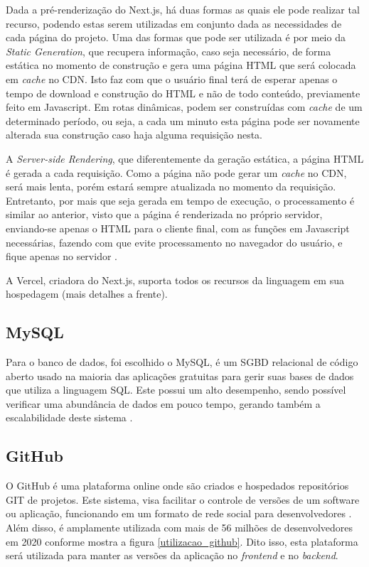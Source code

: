 Dada a pré-renderização do Next.js, há duas formas as quais ele pode realizar tal recurso, podendo estas serem utilizadas em conjunto dada as necessidades de cada página do projeto. Uma das formas que pode ser utilizada é por meio da \textit{Static Generation}, que recupera informação, caso seja necessário, de forma estática no momento de construção e gera uma página HTML que será colocada em \textit{cache} no CDN. Isto faz com que o usuário final terá de esperar apenas o tempo de download e construção do HTML e não de todo conteúdo, previamente feito em Javascript. Em rotas dinâmicas, podem ser construídas com \textit{cache} de um determinado período, ou seja, a cada um minuto esta página pode ser novamente alterada sua construção caso haja alguma requisição nesta.

A \textit{Server-side Rendering}, que diferentemente da geração estática, a página HTML é gerada a cada requisição. Como a página não pode gerar um \textit{cache} no CDN, será mais lenta, porém estará sempre atualizada no momento da requisição. Entretanto, por mais que seja gerada em tempo de execução, o processamento é similar ao anterior, visto que a página é renderizada no próprio servidor, enviando-se apenas o HTML para o cliente final, com as funções em Javascript necessárias, fazendo com que evite processamento no navegador do usuário, e fique apenas no servidor \cite{VERCEL}.

A Vercel, criadora do Next.js, suporta todos os recursos da linguagem em sua hospedagem (mais detalhes a frente).

\subsection{MySQL}
Para o banco de dados, foi escolhido o MySQL, é um SGBD relacional de código aberto usado na maioria das aplicações gratuitas para gerir suas bases de dados que utiliza a linguagem SQL. Este possui um alto desempenho, sendo possível verificar uma abundância de dados em pouco tempo, gerando também a escalabilidade deste sistema \cite{HEUSER}.

\subsection{GitHub}
O GitHub é uma plataforma online onde são criados e hospedados repositórios GIT de projetos. Este sistema, visa facilitar o controle de versões de um software ou aplicação, funcionando em um formato de rede social para desenvolvedores \cite{SANTACROCE}. Além disso, é amplamente utilizada com mais de 56 milhões de desenvolvedores em 2020 conforme mostra a figura \ref{utilizacao_github}. Dito isso, esta plataforma será utilizada para manter as versões da aplicação no \textit{frontend} e no \textit{backend}.

